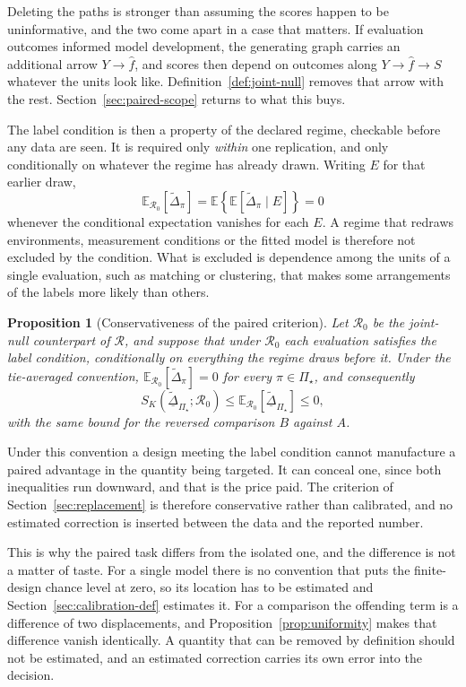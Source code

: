 \documentclass[11pt]{article}
\newcommand{\Regime}{\mathcal{R}}
\newcommand{\PSet}{\Pi_\star}
\newcommand{\E}{\mathbb{E}}
\newcommand{\Dta}{\widetilde{\Delta}}
\newcommand{\RobDta}{\underline{\widetilde{\Delta}}_{\PSet}}
\newtheorem{proposition}{Proposition}
\theoremstyle{remark}
\begin{document}
Deleting the paths is stronger than assuming the scores happen to be uninformative, and the two come apart in a case that matters. If evaluation outcomes informed model development, the generating graph carries an additional arrow $Y\to\widehat f$, and scores then depend on outcomes along $Y\to\widehat f\to S$ whatever the units look like. Definition~\ref{def:joint-null} removes that arrow with the rest. Section~\ref{sec:paired-scope} returns to what this buys.

The label condition is then a property of the declared regime, checkable before any data are seen. It is required only \emph{within} one replication, and only conditionally on whatever the regime has already drawn. Writing $E$ for that earlier draw,
\[
\E_{\Regime_0}\left[\Dta_\pi\right]
=
\E\left\{
\E\left[\Dta_\pi\mid E\right]
\right\}
=
0
\]
whenever the conditional expectation vanishes for each $E$. A regime that redraws environments, measurement conditions or the fitted model is therefore not excluded by the condition. What is excluded is dependence among the units of a single evaluation, such as matching or clustering, that makes some arrangements of the labels more likely than others.

\begin{proposition}[Conservativeness of the paired criterion]
\label{prop:conservative}
Let $\Regime_0$ be the joint-null counterpart of $\Regime$, and suppose that under $\Regime_0$ each evaluation satisfies the label condition, conditionally on everything the regime draws before it. Under the tie-averaged convention, $\E_{\Regime_0}[\Dta_\pi]=0$ for every $\pi\in\PSet$, and consequently
\[
S_K(\RobDta;\Regime_0)
\leq
\E_{\Regime_0}[\RobDta]
\leq
0 ,
\]
with the same bound for the reversed comparison $B$ against $A$.
\end{proposition}

Under this convention a design meeting the label condition cannot manufacture a paired advantage in the quantity being targeted. It can conceal one, since both inequalities run downward, and that is the price paid. The criterion of Section~\ref{sec:replacement} is therefore conservative rather than calibrated, and no estimated correction is inserted between the data and the reported number.

This is why the paired task differs from the isolated one, and the difference is not a matter of taste. For a single model there is no convention that puts the finite-design chance level at zero, so its location has to be estimated and Section~\ref{sec:calibration-def} estimates it. For a comparison the offending term is a difference of two displacements, and Proposition~\ref{prop:uniformity} makes that difference vanish identically. A quantity that can be removed by definition should not be estimated, and an estimated correction carries its own error into the decision.
\end{document}
